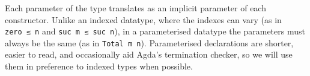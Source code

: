 \begin{fence}
\begin{code}%
\>[0]\AgdaSpace{}%
\AgdaSpace{}%
\AgdaSymbol{:}\AgdaSpace{}%
\AgdaSpace{}%
\AgdaSpace{}%
\AgdaSpace{}%
\AgdaSpace{}%
\AgdaSpace{}%
\<%
\\
%
\\[\AgdaEmptyExtraSkip]%
\>[0][@{}l@{\AgdaIndent{0}}]%
\>[2]\AgdaSpace{}%
\AgdaSymbol{:}\AgdaSpace{}%
\AgdaSpace{}%
\AgdaSymbol{\{}\AgdaSpace{}%
\AgdaSpace{}%
\AgdaSymbol{:}\AgdaSpace{}%
\AgdaSymbol{\}}\<%
\\
\>[2][@{}l@{\AgdaIndent{0}}]%
\>[4]%
\>[289I]\AgdaSpace{}%
\AgdaSpace{}%
\<%
\\
\>[.][@{}l@{}]\<[289I]%
\>[6]\AgdaComment{----------}\<%
\\
%
\>[4]\AgdaSpace{}%
\AgdaSpace{}%
\AgdaSpace{}%
\<%
\\
%
\\[\AgdaEmptyExtraSkip]%
%
\>[2]\AgdaSpace{}%
\AgdaSymbol{:}\AgdaSpace{}%
\AgdaSpace{}%
\AgdaSymbol{\{}\AgdaSpace{}%
\AgdaSpace{}%
\AgdaSymbol{:}\AgdaSpace{}%
\AgdaSymbol{\}}\<%
\\
\>[2][@{}l@{\AgdaIndent{0}}]%
\>[4]%
\>[301I]\AgdaSpace{}%
\AgdaSpace{}%
\<%
\\
\>[.][@{}l@{}]\<[301I]%
\>[6]\AgdaComment{----------}\<%
\\
%
\>[4]\AgdaSpace{}%
\AgdaSpace{}%
\AgdaSpace{}%
\<%
\end{code}
\end{fence}

Each parameter of the type translates as an implicit parameter of each
constructor. Unlike an indexed datatype, where the indexes can vary (as
in \texttt{zero\ ≤\ n} and \texttt{suc\ m\ ≤\ suc\ n}), in a
parameterised datatype the parameters must always be the same (as in
\texttt{Total\ m\ n}). Parameterised declarations are shorter, easier to
read, and occasionally aid Agda's termination checker, so we will use
them in preference to indexed types when possible.


